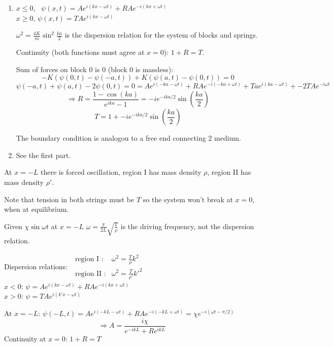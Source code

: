 \documentclass[twoside,10pt]{amsart}
\newcommand{\problemhead}[1]
  {\smallskip
   \noindent{\large\bf Problem #1.}
   \smallskip}
\begin{document}
\problemhead{9.4} \begin{enumerate}
\item $x \leq 0$, \, $\psi(x,t) = A e^{i ( kx - \omega t) } +RA e^{ - i ( kx + \omega t) } $ \\
$x \geq 0$, $\psi(x,t) = TA e^{i (kx- \omega t) }$  

$\omega^2 = \frac{4K}{m} \sin^2{ \frac{ka}{2}}$ is the dispersion relation for the system of blocks and springs.  

Continuity (both functions must agree at $x=0$): $1 + R = T$.  

Sum of forces on block 0 is 0 (block 0 is massless): 
\[
-K(\psi(0,t) - \psi(-a,t)) + K(\psi(a,t) - \psi(0,t) ) =0  
\]
\[
\psi(-a,t) + \psi(a,t) - 2 \psi(0,t) = 0 = Ae^{i (-ka - \omega t)} + RA e^{ -i ( -ka + \omega t)} + Ta e^{i (ka - \omega t) } + -2 TA e^{-i\omega t} 
\]
\[
\Longrightarrow R = \frac{1 - \cos{(ka) } }{ e^{ika} - 1 } = -i e^{-ika/2} \sin{\left( \frac{ka}{2} \right) }
\]
\[
T = 1 + -ie^{ -ika/2} \sin{ \left( \frac{ka}{2} \right) }
\]

The boundary condition is analogou to a free end connecting 2 medium.  

\item See the first part.  
\end{enumerate}

\problemhead{9.5} At $x=-L$ there is forced oscillation, region I has mass density $\rho$, region II has mass density $\rho'$.  

Note that tension in both strings must be $T$ so the system won't break at $x=0$, when at equilibrium.  

Given $\chi \sin{\omega t}$ at $x=-L$
$\omega  =\frac{\pi}{2L} \sqrt{ \frac{ T}{\rho} }$ is the driving frequency, not the dispersion relation.  

Dispersion relations: $\begin{aligned} \text{ region I }: & \omega^2 = \frac{ T}{\rho} k^2 \\ \text{ region II }: & \omega^2 = \frac{T}{\rho'} k'^2 \end{aligned}$  \\
$x < 0$: $\psi = Ae^{i (kx-\omega t) } + RA e^{-i (kx + \omega t) } $ \\
$x > 0$: $\psi = TA e^{i (k'x - \omega t) }$ 

At $x= -L$: $\psi(-L,t) = Ae^{i (-kL - \omega t) } + RA e^{-i ( -kL + \omega t) } = \chi e^{ - i (\omega t- \pi/2 ) }$  \[
\Longrightarrow A = \frac{ i \chi }{ e^{-ikL } + Re^{ikL } }
\]
Continuity at $x=0$: $1 + R =T$
\end{document}
